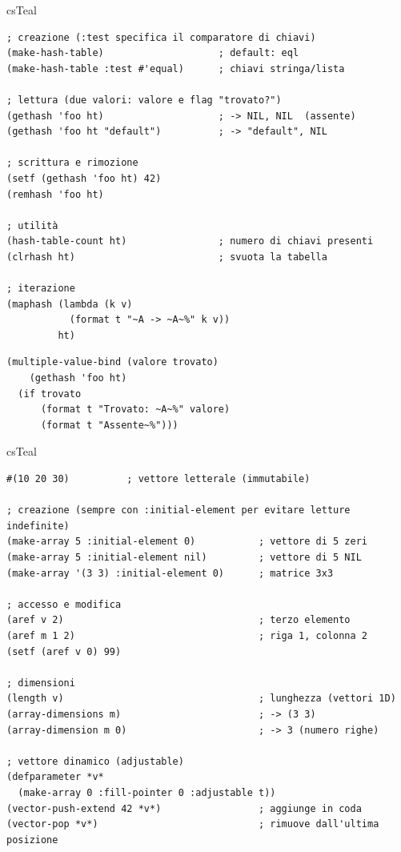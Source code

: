 \begin{refbox}{csTeal}
\label{sec:hashtable}

\begin{lstlisting}
; creazione (:test specifica il comparatore di chiavi)
(make-hash-table)                    ; default: eql
(make-hash-table :test #'equal)      ; chiavi stringa/lista

; lettura (due valori: valore e flag "trovato?")
(gethash 'foo ht)                    ; -> NIL, NIL  (assente)
(gethash 'foo ht "default")          ; -> "default", NIL

; scrittura e rimozione
(setf (gethash 'foo ht) 42)
(remhash 'foo ht)

; utilità
(hash-table-count ht)                ; numero di chiavi presenti
(clrhash ht)                         ; svuota la tabella

; iterazione
(maphash (lambda (k v)
           (format t "~A -> ~A~%" k v))
         ht)
\end{lstlisting}

\begin{refnote}
\begin{lstlisting}
(multiple-value-bind (valore trovato)
    (gethash 'foo ht)
  (if trovato
      (format t "Trovato: ~A~%" valore)
      (format t "Assente~%")))
\end{lstlisting}
\end{refnote}

\end{refbox}

\begin{refbox}{csTeal}
\label{sec:array}

\begin{lstlisting}
#(10 20 30)          ; vettore letterale (immutabile)

; creazione (sempre con :initial-element per evitare letture indefinite)
(make-array 5 :initial-element 0)           ; vettore di 5 zeri
(make-array 5 :initial-element nil)         ; vettore di 5 NIL
(make-array '(3 3) :initial-element 0)      ; matrice 3x3

; accesso e modifica
(aref v 2)                                  ; terzo elemento
(aref m 1 2)                                ; riga 1, colonna 2
(setf (aref v 0) 99)

; dimensioni
(length v)                                  ; lunghezza (vettori 1D)
(array-dimensions m)                        ; -> (3 3)
(array-dimension m 0)                       ; -> 3 (numero righe)

; vettore dinamico (adjustable)
(defparameter *v*
  (make-array 0 :fill-pointer 0 :adjustable t))
(vector-push-extend 42 *v*)                 ; aggiunge in coda
(vector-pop *v*)                            ; rimuove dall'ultima posizione
\end{lstlisting}

\end{refbox}


